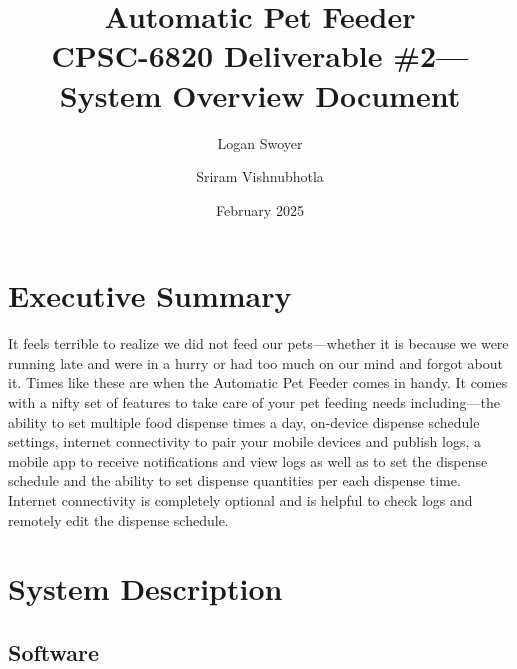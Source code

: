 \documentclass{article}
\title{Automatic Pet Feeder\\
\large CPSC-6820 Deliverable \#2---System Overview Document}
\author{Logan Swoyer \and Sriram Vishnubhotla}
\date{February 2025}
\begin{document}
\maketitle

\section{Executive Summary}
It feels terrible to realize we did not feed our pets---whether it is because we were running late and were in a hurry or had too much on our mind and forgot about it. Times like these are when the Automatic Pet Feeder comes in handy. It comes with a nifty set of features to take care of your pet feeding needs including---the ability to set multiple food dispense times a day, on-device dispense schedule settings, internet connectivity to pair your mobile devices and publish logs, a mobile app to receive notifications and view logs as well as to set the dispense schedule and the ability to set dispense quantities per each dispense time. Internet connectivity is completely optional and is helpful to check logs and remotely edit the dispense schedule.

\section{System Description}
\subsection{Software}
\end{document}
